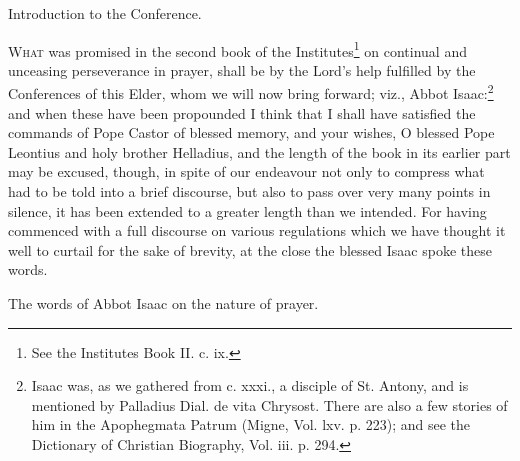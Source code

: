 

Introduction to the Conference.

\textsc{What} was promised in the second book of the Institutes\footnote{See the Institutes Book II. c. ix.} on continual and unceasing perseverance in prayer, shall be by the Lord’s help fulfilled by the Conferences of this Elder, whom we will now bring forward; viz., Abbot Isaac:\footnote{Isaac was, as we gathered from c. xxxi., a disciple of St. Antony, and is mentioned by Palladius Dial. de vita Chrysost. There are also a few stories of him in the Apophegmata Patrum (Migne, Vol. lxv. p. 223); and see the Dictionary of Christian Biography, Vol. iii. p. 294.} and when these have been propounded I think that I shall have satisfied the commands of Pope Castor of blessed memory, and your wishes, O blessed Pope Leontius and holy brother Helladius, and the length of the book in its earlier part may be excused, though, in spite of our endeavour not only to compress what had to be told into a brief discourse, but also to pass over very many points in silence, it has been extended to a greater length than we intended. For having commenced with a full discourse on various regulations which we have thought it well to curtail for the sake of brevity, at the close the blessed Isaac spoke these words.


The words of Abbot Isaac on the nature of prayer.

